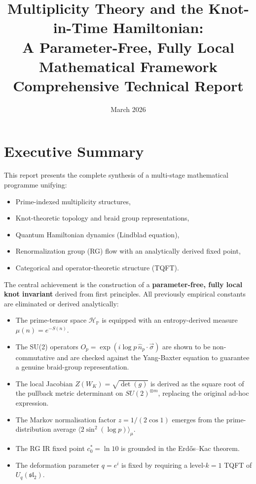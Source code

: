 \documentclass[11pt]{article}
\title{\textbf{Multiplicity Theory and the Knot-in-Time Hamiltonian:\\
A Parameter-Free, Fully Local Mathematical Framework}\\[0.5em]
\large Comprehensive Technical Report}
\author{}
\date{March 2026}
\newcommand{\PP}{\mathbb{P}}
\newcommand{\hatN}[1]{\hat{n}_{#1}}
\begin{document}
\maketitle
\section*{Executive Summary}

This report presents the complete synthesis of a multi-stage mathematical programme unifying:

\begin{itemize}
  \item Prime-indexed multiplicity structures,
  \item Knot-theoretic topology and braid group representations,
  \item Quantum Hamiltonian dynamics (Lindblad equation),
  \item Renormalization group (RG) flow with an analytically derived fixed point,
  \item Categorical and operator-theoretic structure (TQFT).
\end{itemize}

The central achievement is the construction of a \textbf{parameter-free, fully local knot invariant} derived from first principles. All previously empirical constants are eliminated or derived analytically:

\begin{itemize}
  \item The prime-tensor space $\mathcal{H}_\PP$ is equipped with an entropy-derived measure $\mu(n)=e^{-S(n)}$.
  \item The SU(2) operators $O_p = \exp(i\log p\,\hatN{p}\cdot\vec{\sigma})$ are shown to be non-commutative and are checked against the Yang-Baxter equation to guarantee a genuine braid-group representation.
  \item The local Jacobian $Z(W_K)=\sqrt{\det(g)}$ is derived as the square root of the pullback metric determinant on $SU(2)^{\otimes m}$, replacing the original ad-hoc expression.
  \item The Markov normalisation factor $z=1/(2\cos 1)$ emerges from the prime-distribution average $\langle 2\sin^2(\log p)\rangle_\mu$.
  \item The RG IR fixed point $c_0^* = \ln 10$ is grounded in the Erd\H{o}s--Kac theorem.
  \item The deformation parameter $q=e^{i}$ is fixed by requiring a level-$k=1$ TQFT of $U_q(\mathfrak{sl}_2)$.
\end{itemize}
\end{document}
